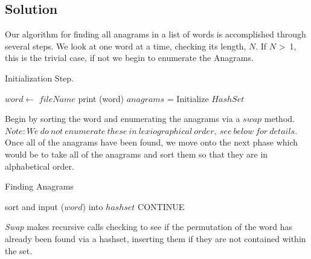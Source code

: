 \documentclass[12pt]{article}
\begin{document}

\subsection{Solution}

Our algorithm for finding all anagrams in a list of words is accomplished
through several steps. We look at one word at a time, checking its length, $N$.
If $N$ \textgreater\ 1, this is the trivial case, if not we begin to enumerate
the Anagrams.

\begin{algorithm}[H]
\caption{Initialization Step.}
\begin{algorithmic}
            \State $word \gets$ $fileName$
                \State print (word)
            \Else
                \State $anagrams$ = Initialize $HashSet$
                \State {}
            \EndIf
        \EndWhile
    \EndProcedure
\end{algorithmic}
\end{algorithm}

Begin by sorting the word and enumerating the anagrams via a $swap$ method.
$Note: We\ do\ not\ enumerate\ these\ in\ lexiographical\ order,\ see\ below\ for\ details$.
Once all of the anagrams have been found, we move onto the next phase which would be to take
all of the anagrams and sort them so that they are in alphabetical order.

\begin{algorithm}[H]
\caption{Finding Anagrams}
\begin{algorithmic}
        \State sort and input \big($word$\big)  into $hashset$
                    \State CONTINUE
                \Else
                    \State {}
                \EndIf
            \EndFor
        \EndFor
        \State {}
        \State {}
    \EndProcedure
\end{algorithmic}
\end{algorithm}

{\em Swap} makes recursive calls checking to see if the permutation of
the word has already been found via a hashset, inserting them if they
are not contained within the set.
\end{document}
